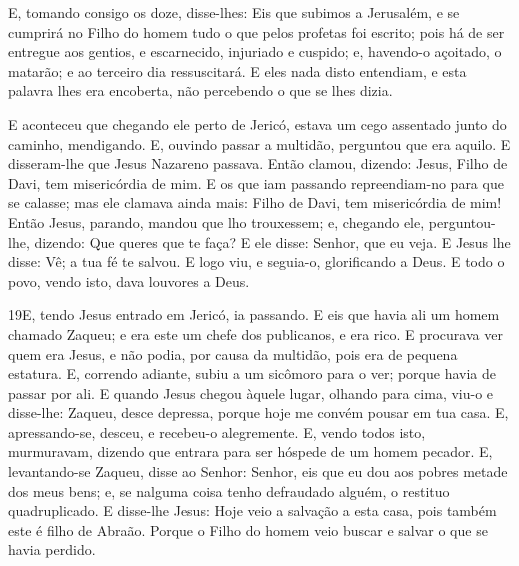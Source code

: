 E, tomando consigo os doze, disse-lhes: Eis que subimos a
Jerusalém, e se cumprirá no Filho do homem tudo o que pelos profetas
foi escrito; pois há de ser entregue aos gentios, e
escarnecido, injuriado e cuspido; e, havendo-o açoitado, o
matarão; e ao terceiro dia ressuscitará. E eles nada disto
entendiam, e esta palavra lhes era encoberta, não percebendo o que
se lhes dizia.

E aconteceu que chegando ele perto de Jericó, estava um cego
assentado junto do caminho, mendigando. E, ouvindo passar a
multidão, perguntou que era aquilo. E disseram-lhe que Jesus
Nazareno passava. Então clamou, dizendo: Jesus, Filho de
Davi, tem misericórdia de mim. E os que iam passando
repreendiam-no para que se calasse; mas ele clamava ainda mais:
Filho de Davi, tem misericórdia de mim! Então Jesus, parando,
mandou que lho trouxessem; e, chegando ele, perguntou-lhe,
dizendo: Que queres que te faça? E ele disse: Senhor, que eu
veja. E Jesus lhe disse: Vê; a tua fé te salvou. E
logo viu, e seguia-o, glorificando a Deus. E todo o povo, vendo
isto, dava louvores a Deus.

\medskip

\lettrine{19} E, tendo Jesus entrado em Jericó, ia passando.
E eis que havia ali um homem chamado Zaqueu; e era este um chefe
dos publicanos, e era rico. E procurava ver quem era Jesus, e
não podia, por causa da multidão, pois era de pequena estatura.
E, correndo adiante, subiu a um sicômoro para o ver; porque
havia de passar por ali. E quando Jesus chegou àquele lugar,
olhando para cima, viu-o e disse-lhe: Zaqueu, desce depressa, porque
hoje me convém pousar em tua casa. E, apressando-se, desceu, e
recebeu-o alegremente. E, vendo todos isto, murmuravam, dizendo
que entrara para ser hóspede de um homem pecador. E,
levantando-se Zaqueu, disse ao Senhor: Senhor, eis que eu dou aos
pobres metade dos meus bens; e, se nalguma coisa tenho defraudado
alguém, o restituo quadruplicado. E disse-lhe Jesus: Hoje veio a
salvação a esta casa, pois também este é filho de Abraão.
Porque o Filho do homem veio buscar e salvar o que se havia
perdido.

